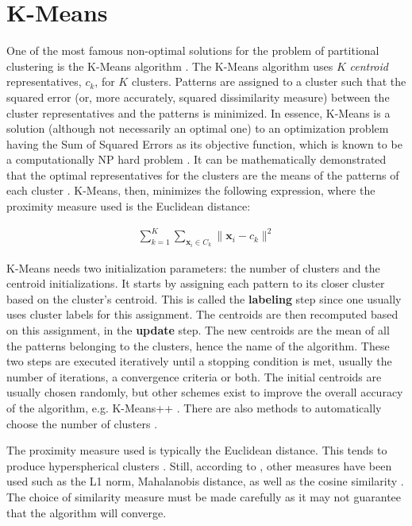 \section{K-Means}
\label{sec:kmeans}

One of the most famous non-optimal solutions for the problem of partitional clustering is the K-Means algorithm \cite{kmeansoriginal}.
The K-Means algorithm uses $K$ \emph{centroid} representatives, $c_k$, for $K$ clusters.
Patterns are assigned to a cluster such that the squared error (or, more accurately, squared dissimilarity measure) between the cluster representatives and the patterns is minimized.
In essence, K-Means is a solution (although not necessarily an optimal one) to an optimization problem having the Sum of Squared Errors as its objective function, which is known to be a computationally NP hard problem \cite{Jain2010}.
It can be mathematically demonstrated that the optimal representatives for the clusters are the means of the patterns of each cluster \cite{Aggarwal2014}.
K-Means, then, minimizes the following expression, where the proximity measure used is the Euclidean distance:

\begin{align}
    \sum^K_{k=1} \sum_{\mathbf{x}_i \in C_k} \| \mathbf{x}_i - c_k  \| ^2  \label{eq:sse}
\end{align}

K-Means needs two initialization parameters: the number of clusters and the centroid initializations.
It starts by assigning each pattern to its closer cluster based on the cluster's centroid.
This is called the \textbf{labeling} step since one usually uses cluster labels for this assignment.
The centroids are then recomputed based on this assignment, in the \textbf{update} step.
The new centroids are the mean of all the patterns belonging to the clusters, hence the name of the algorithm.
These two steps are executed iteratively until a stopping condition is met, usually the number of iterations, a convergence criteria or both.
The initial centroids are usually chosen randomly, but other schemes exist to improve the overall accuracy of the algorithm, e.g. K-Means++ \cite{Arthur2007}.
There are also methods to automatically choose the number of clusters \cite{Aggarwal2014}.

The proximity measure used is typically the Euclidean distance.
This tends to produce hyperspherical clusters \cite{Jain1999}.
Still, according to \cite{Jain2010}, other measures have been used such as the L1 norm, Mahalanobis distance, as well as the cosine similarity \cite{Aggarwal2014}.
The choice of similarity measure must be made carefully as it may not guarantee that the algorithm will converge.

